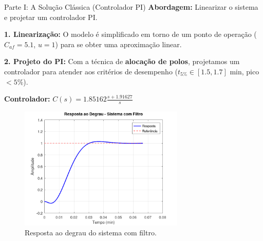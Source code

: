 \documentclass{beamer}
\begin{document}
\begin{frame}{Parte I: A Solução Clássica (Controlador PI)}
    \large \textbf{Abordagem:} Linearizar o sistema e projetar um controlador PI.
    \vspace{0.5em}
    
    \small
    \textbf{1. Linearização:} O modelo é simplificado em torno de um ponto de operação (\(C_{af}=5.1\), \(u=1\)) para se obter uma aproximação linear.
    
    \textbf{2. Projeto do PI:} Com a técnica de \textbf{alocação de polos}, projetamos um controlador para atender aos critérios de desempenho (\(t_{5\%} \in [1.5, 1.7]\) min, pico \(< 5\%\)).
    
    \textbf{Controlador:} \tiny \( C(s) = 1.85162 \frac{s + 1.91627}{s} \)
    
    \begin{figure}
        \centering
        \includegraphics[width=0.7\textwidth]{figura_analise_temporal.png}
        \caption{\tiny Resposta ao degrau do sistema com filtro.}
    \end{figure}
    
\end{frame}
\end{document}
